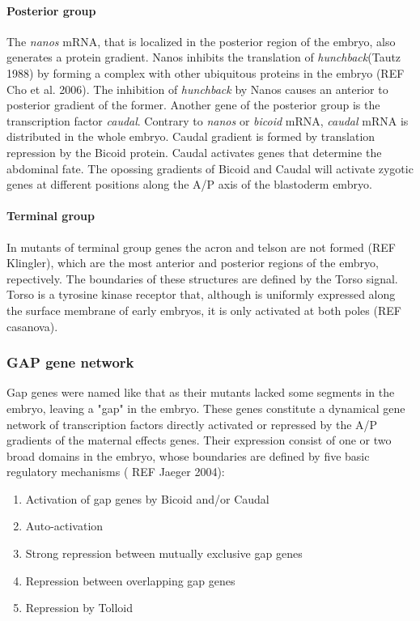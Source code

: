 \paragraph{Posterior group}
The \textit{nanos} mRNA, that is localized in the posterior region of the embryo, also generates a protein gradient. Nanos inhibits the translation of \textit{hunchback}(Tautz 1988) by forming a complex with other ubiquitous proteins in the embryo (REF Cho et al. 2006). The inhibition of \textit{hunchback} by Nanos causes an anterior to posterior gradient of the former. 
Another gene of the posterior group is the transcription factor \textit{caudal}. Contrary to \textit{nanos} or \textit{bicoid} mRNA, \textit{caudal} mRNA is distributed in the whole embryo.
Caudal gradient is formed by translation repression by the Bicoid protein. Caudal activates genes that determine the abdominal fate. 
The opossing gradients of Bicoid and Caudal will activate zygotic genes at different positions along the A/P axis of the blastoderm embryo.

\paragraph{Terminal group}
In mutants of terminal group genes the acron and telson are not formed (REF Klingler), which are the most anterior and posterior regions of the embryo, repectively. 
The boundaries of these structures are defined by the Torso signal. 
Torso is a tyrosine kinase receptor that, although is uniformly expressed along the surface membrane of early embryos, it is only activated at both poles (REF casanova).



\subsubsection{GAP gene network}

Gap genes were named like that as their mutants lacked some segments in the embryo, leaving a "gap" in the embryo. 
These genes constitute a dynamical gene network of transcription factors directly activated or repressed by the A/P gradients of the maternal effects genes.
Their expression consist of one or two broad domains in the embryo, whose boundaries are defined by five basic regulatory mechanisms ( REF Jaeger 2004):
\begin{enumerate}
\item Activation of gap genes by Bicoid and/or Caudal
\item Auto-activation
\item Strong repression between mutually exclusive gap genes
\item Repression between overlapping gap genes
\item Repression by Tolloid
\end{enumerate}

